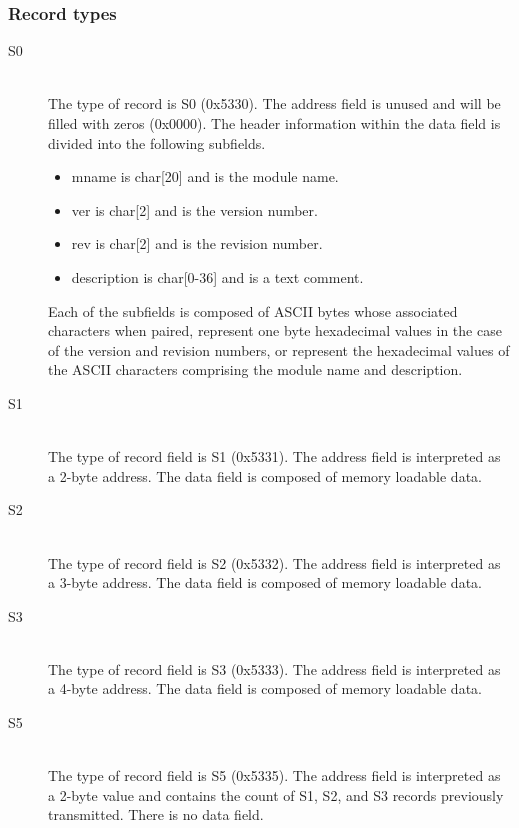         \subsubsection{Record types}
            \begin{description}
                \item[S0]~\\
                    The type of record is S0 (0x5330). The address field is unused and will be filled with zeros (0x0000). The header information within the data field is divided into the following subfields.

                    \begin{itemize}
                        \item mname is char[20] and is the module name.
                        \item ver is char[2] and is the version number.
                        \item rev is char[2] and is the revision number.
                        \item description is char[0-36] and is a text comment.
                    \end{itemize}

                    Each of the subfields is composed of ASCII bytes whose associated characters when paired, represent one byte hexadecimal values in the case of the version and revision numbers, or represent the hexadecimal values of the ASCII characters comprising the module name and description.

                \item[S1]~\\
                    The type of record field is S1 (0x5331). The address field is interpreted as a 2-byte address. The data field is composed of memory loadable data.

                \item[S2]~\\
                    The type of record field is S2 (0x5332). The address field is interpreted as a 3-byte address. The data field is composed of memory loadable data.

                \item[S3]~\\
                    The type of record field is S3 (0x5333). The address field is interpreted as a 4-byte address. The data field is composed of memory loadable data.

                \item[S5]~\\
                    The type of record field is S5 (0x5335). The address field is interpreted as a 2-byte value and contains the count of S1, S2, and S3 records previously transmitted. There is no data field.


\end{description}
